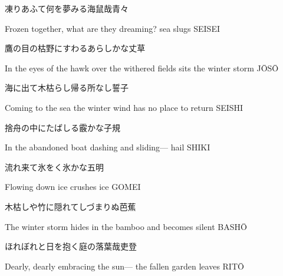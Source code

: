\begin{haiku}
    {\FH 凍りあふて何を夢みる海鼠哉}\hfill{\FH 青々}

    \vin{} Frozen together,
    \vin{} \vin{} what are they dreaming?
    \vin{} \vin{} \vin{} sea slugs \hspace{\fill} SEISEI
\end{haiku}

\begin{haiku}
    {\FH 鷹の目の枯野にすわるあらしかな}\hfill{\FH 丈草}

    \vin{} In the eyes of the hawk
    \vin{} \vin{} over the withered fields
    \vin{} \vin{} \vin{} sits the winter storm \hspace{\fill} J\={O}S\={O}
\end{haiku}

\begin{haiku}
    {\FH 海に出て木枯らし帰る所なし}\hfill{\FH 誓子}

    \vin{} Coming to the sea
    \vin{} \vin{} the winter wind has no place
    \vin{} \vin{} \vin{} to return \hspace{\fill} SEISHI
\end{haiku}

\begin{haiku}
    {\FH 捨舟の中にたばしる霰かな}\hfill{\FH 子規}

    \vin{} In the abandoned boat
    \vin{} \vin{} dashing and sliding---
    \vin{} \vin{} \vin{} hail \hspace{\fill} SHIKI
\end{haiku}

\begin{haiku}
    {\FH 流れ来て氷をく氷かな}\hfill{\FH 五明}

    \vin{} Flowing down
    \vin{} \vin{} ice crushes
    \vin{} \vin{} \vin{} ice \hspace{\fill} GOMEI
\end{haiku}

\begin{haiku}
    {\FH 木枯しや竹に隠れてしづまりぬ}\hfill{\FH 芭蕉}

    \vin{} The winter storm
    \vin{} \vin{} hides in the bamboo
    \vin{} \vin{} \vin{} and becomes silent \hspace{\fill} BASH\={O}
\end{haiku}

\begin{haiku}
    {\FH ほれぼれと日を抱く庭の落葉哉}\hfill{\FH 吏登}

    \vin{} Dearly, dearly
    \vin{} \vin{} embracing the sun---
    \vin{} \vin{} \vin{} the fallen garden leaves \hspace{\fill} RIT\={O}
\end{haiku}

